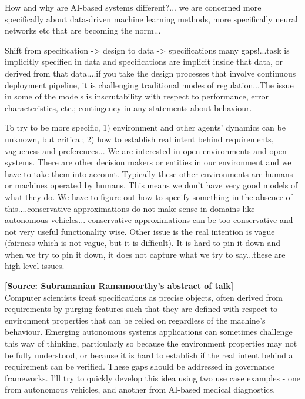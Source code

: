 \documentclass[sigconf]{acmart}
\begin{document}
How and why are AI-based systems different?... we are concerned more specifically about data-driven machine learning methods, more specifically neural networks etc that are becoming the norm...

Shift from specification -> design to data -> specifications many gaps!...task is implicitly specified in data and specifications are implicit inside that data, or derived from that data....if you take the design processes that involve continuous deployment pipeline, it is challenging traditional modes of regulation...The issue in some of the models is inscrutability with respect to performance, error characteristics, etc.; contingency in any statements about behaviour.

To try to be more specific, 1) environment and other agents' dynamics can be unknown, but critical; 2) how to establish real intent behind requirements, vagueness and preferences...
We are interested in open environments and open systems. There are other decision makers or entities in our environment and we have to take them into account. Typically these other environments are humans or machines operated by humans. This means we don't have very good models of what they do. We have to figure out how to specify something in the absence of this....conservative approximations do not make sense in domains like autonomous vehicles... conservative approximations can be too conservative and not very useful functionality wise. Other issue is the real intention is vague (fairness which is not vague, but it is difficult). It is hard to pin it down and when we try to pin it down, it does not capture what we try to say...these are high-level issues.

\noindent\textbf{[Source: Subramanian Ramamoorthy's abstract of talk]}\\
Computer scientists treat specifications as precise objects, often derived from requirements by purging features such that they are defined with respect to environment properties that can be relied on regardless of the machine's behaviour. Emerging autonomous systems applications can sometimes challenge this way of thinking, particularly so because the environment properties may not be fully understood, or because it is hard to establish if the real intent behind a requirement can be verified. These gaps should be addressed in governance frameworks. I'll try to quickly develop this idea using two use case examples - one from autonomous vehicles, and another from AI-based medical diagnostics.

\end{document}

